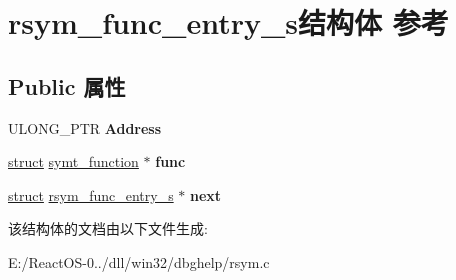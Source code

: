 \hypertarget{structrsym__func__entry__s}{}\section{rsym\+\_\+func\+\_\+entry\+\_\+s结构体 参考}
\label{structrsym__func__entry__s}
\subsection*{Public 属性}
\begin{DoxyCompactItemize}
\item 
\mbox{\label{structrsym__func__entry__s_a356cb847f8e4f9e9c1310e26c98a2562}} 
U\+L\+O\+N\+G\+\_\+\+P\+TR {\bfseries Address}
\item 
\mbox{\label{structrsym__func__entry__s_ab03906dbd24982d155372162aede0b71}} 
\hyperlink{interfacestruct}{struct} \hyperlink{structsymt__function}{symt\+\_\+function} $\ast$ {\bfseries func}
\item 
\mbox{\label{structrsym__func__entry__s_a14b4ff4ce9fe55ac9228ba35fd80db2e}} 
\hyperlink{interfacestruct}{struct} \hyperlink{structrsym__func__entry__s}{rsym\+\_\+func\+\_\+entry\+\_\+s} $\ast$ {\bfseries next}
\end{DoxyCompactItemize}


该结构体的文档由以下文件生成\+:\begin{DoxyCompactItemize}
\item 
E\+:/\+React\+O\+S-\/0../dll/win32/dbghelp/rsym.\+c\end{DoxyCompactItemize}
